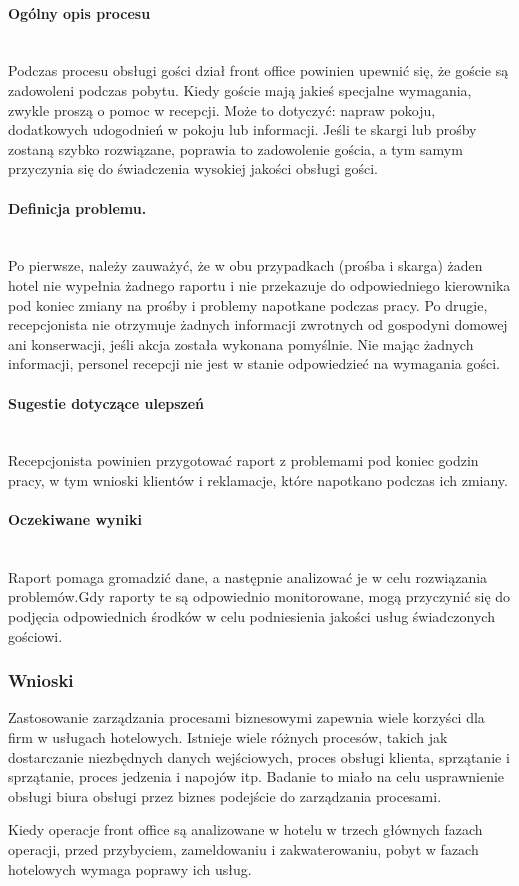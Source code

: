 \documentclass[a4paper, 12pt]{article}
\begin{document}
\paragraph{Ogólny opis procesu}\mbox{}\\
\hspace{1cm} Podczas procesu obsługi gości dział front office powinien upewnić się, że goście są zadowoleni podczas pobytu. Kiedy goście mają jakieś specjalne wymagania, zwykle proszą o pomoc w recepcji. Może to dotyczyć: napraw pokoju, dodatkowych udogodnień w pokoju lub informacji. Jeśli te skargi lub prośby zostaną szybko rozwiązane, poprawia to zadowolenie gościa, a tym samym przyczynia się do świadczenia wysokiej jakości obsługi gości.
\paragraph{Definicja problemu.}\mbox{}\\
Po pierwsze, należy zauważyć, że w obu przypadkach (prośba i skarga) żaden hotel nie wypełnia żadnego raportu i nie przekazuje do odpowiedniego kierownika pod koniec zmiany na prośby i problemy napotkane podczas pracy. Po drugie, recepcjonista nie otrzymuje żadnych informacji zwrotnych od gospodyni domowej ani konserwacji, jeśli akcja została wykonana pomyślnie. Nie mając żadnych informacji, personel recepcji nie jest w stanie odpowiedzieć na wymagania gości.
\paragraph{Sugestie dotyczące ulepszeń}\mbox{}\\
Recepcjonista powinien przygotować raport z problemami pod koniec godzin pracy, w tym wnioski klientów i reklamacje, które napotkano podczas ich zmiany.

\paragraph{Oczekiwane wyniki}\mbox{}\\
Raport pomaga gromadzić dane, a następnie analizować je w celu rozwiązania problemów.Gdy raporty te są odpowiednio monitorowane, mogą przyczynić się do podjęcia odpowiednich środków w celu podniesienia jakości usług świadczonych gościowi.

\subsubsection{Wnioski}
Zastosowanie zarządzania procesami biznesowymi zapewnia wiele korzyści dla firm w usługach hotelowych. Istnieje wiele różnych procesów, takich jak dostarczanie niezbędnych danych wejściowych, proces obsługi klienta, sprzątanie i sprzątanie, proces jedzenia i napojów itp. Badanie to miało na celu usprawnienie obsługi biura obsługi przez biznes podejście do zarządzania procesami.

Kiedy operacje front office są analizowane w hotelu w trzech głównych fazach operacji, przed przybyciem, zameldowaniu i zakwaterowaniu, pobyt w fazach hotelowych wymaga poprawy ich usług.

\label{LastPage}~
\label{LastPageOfBackMatter}~		
\end{document}
